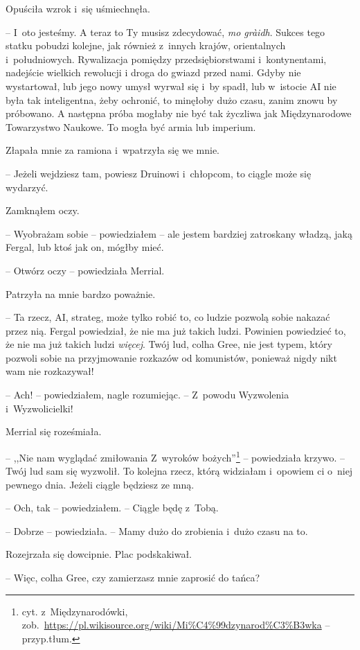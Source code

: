 \documentclass[oneside,polish,11pt,sfheadings]{mwbk}
\begin{document}
Opuściła wzrok i~się uśmiechnęła. 

-- I~oto jesteśmy. A teraz to Ty musisz
zdecydować, \textit{mo gràidh}. Sukces tego statku pobudzi kolejne, jak
również z~innych krajów, orientalnych i~południowych. Rywalizacja
pomiędzy przedsiębiorstwami i~kontynentami, nadejście wielkich rewolucji
i droga do gwiazd przed nami. Gdyby nie wystartował, lub jego nowy umysł
wyrwał się i~by spadł, lub w~istocie AI nie była tak inteligentna, żeby
ochronić, to minęłoby dużo czasu, zanim znowu by próbowano. A następna
próba mogłaby nie być tak życzliwa jak Międzynarodowe Towarzystwo
Naukowe. To mogła być armia lub imperium.

Złapała mnie za ramiona i~wpatrzyła się we mnie. 

-- Jeżeli wejdziesz tam,
powiesz Druinowi i~chłopcom, to ciągle może się wydarzyć.

Zamknąłem oczy. 

-- Wyobrażam sobie -- powiedziałem -- ale jestem bardziej
zatroskany władzą, jaką Fergal, lub ktoś jak on, mógłby mieć.

-- Otwórz oczy -- powiedziała Merrial.

Patrzyła na mnie bardzo poważnie. 

-- Ta rzecz, AI, strateg, może tylko
robić to, co ludzie pozwolą sobie nakazać przez nią. Fergal powiedział,
że nie ma już takich ludzi. Powinien powiedzieć to, że nie ma już takich
ludzi \textit{więcej}. Twój lud, colha Gree, nie jest typem, który pozwoli
sobie na przyjmowanie rozkazów od komunistów, ponieważ nigdy nikt wam
nie rozkazywał!

-- Ach! -- powiedziałem, nagle rozumiejąc. -- Z~powodu Wyzwolenia i~Wyzwolicielki!

Merrial się roześmiała.

-- ,,Nie nam wyglądać zmiłowania Z~wyroków bożych''\footnote{cyt. z~Międzynarodówki,
zob.~\url{https://pl.wikisource.org/wiki/Mi\%C4\%99dzynarod\%C3\%B3wka}
-- przyp.tłum.} -- powiedziała krzywo. -- Twój lud sam się wyzwolił. To
kolejna rzecz, którą widziałam i~opowiem ci o~niej pewnego dnia. Jeżeli
ciągle będziesz ze mną.

-- Och, tak -- powiedziałem. -- Ciągle będę z~Tobą.

-- Dobrze -- powiedziała. -- Mamy dużo do zrobienia i~dużo czasu na to.

Rozejrzała się dowcipnie. Plac podskakiwał.

-- Więc, colha Gree, czy zamierzasz mnie zaprosić do tańca?
\end{document}

